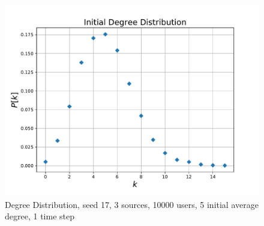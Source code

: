 \begin{figure}[htpb]
  \centering
  \includegraphics[width=.7\columnwidth]{img/pdf/gauss.pdf}
  \caption{Degree Distribution, seed 17, 3 sources, 10000 users, 5 initial average degree, 1 time step}
  \label{fig:gauss}
\end{figure}
